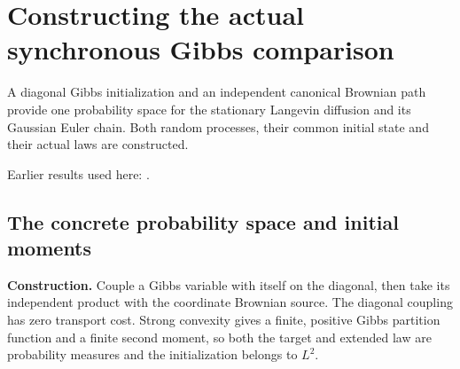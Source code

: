 \documentclass[11pt,a4paper]{report}
\begin{document}
\section{\texorpdfstring{Constructing the actual synchronous Gibbs comparison}{Constructing the actual synchronous Gibbs comparison}}
\label{proof-module-WassersteinMixing-ActualComparison-lean}


A diagonal Gibbs initialization and an independent canonical Brownian path provide one probability space for the stationary Langevin diffusion and its Gaussian Euler chain. Both random processes, their common initial state and their actual laws are constructed.



Earlier results used here: \cite[Section~3.45]{LangevinLean2026ULASC}.
\subsection{\texorpdfstring{The concrete probability space and initial moments}{The concrete probability space and initial moments}}
\label{report-step-WassersteinMixing-ActualComparison-lean-1}


\textbf{Construction.} Couple a Gibbs variable with itself on the diagonal, then take its independent product with the coordinate Brownian source. The diagonal coupling has zero transport cost. Strong convexity gives a finite, positive Gibbs partition function and a finite second moment, so both the target and extended law are probability measures and the initialization belongs to \(L^2\).
\end{document}
